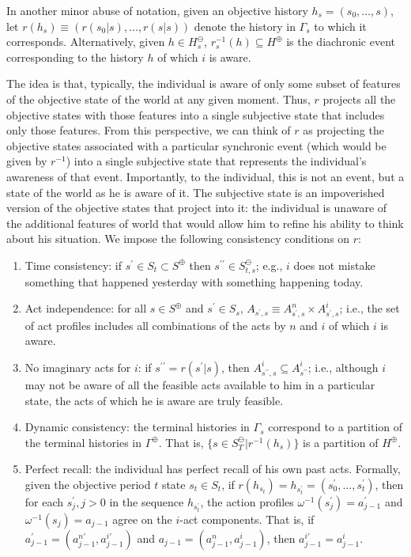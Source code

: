 \documentclass[
11pt,
titlepage,
reqno,
]{article}%
\theoremstyle{definition}
\begin{document}
In another minor abuse of notation, given an objective history $h_s=(s_0,\ldots,s)$, let $r(h_s)\equiv(r(s_0|s),\ldots,r(s|s))$ denote the history in $\Gamma_s$ to which it corresponds.
Alternatively, given $h\in H^\ominus_s$, $r^{-1}_s(h)\subseteq H^\oplus$ is the diachronic event corresponding to the history $h$ of which $i$ is aware.

The idea is that, typically, the individual is aware of only some subset of features of the objective state of the world at any given moment.
Thus, $r$ projects all the objective states with those features into a single subjective state that includes only those features.
From this perspective, we can think of $r$ as projecting the objective states associated with a particular synchronic event (which would be given by $r^{-1}$) into a single subjective state that represents the individual's awareness of that event.
Importantly, to the individual, this is not an event, but a state of the world as he is aware of it.
The subjective state is an impoverished version of the objective states that project into it: the individual is unaware of the additional features of world that would allow him to refine his ability to think about his situation. 
We impose the following consistency conditions on $r$:
\begin{enumerate}
	\item Time consistency: if $s^\prime\in S_t\subset S^\oplus$ then $s^{\prime\prime}\in S^\ominus_{t,s}$; e.g., $i$ does not mistake something that happened yesterday with something happening today.
	\item Act independence: for all $s\in S^\oplus$ and $s^\prime\in S_s$, $A_{s^\prime,s}\equiv A^n_{s^\prime,s}\times A^i_{s^\prime,s}$; i.e., the set of act profiles includes all combinations of the acts by $n$ and $i$ of which $i$ is aware.
	\item No imaginary acts for $i$: if $s^{\prime\prime}=r(s^\prime|s)$, then $A^i_{s^{\prime\prime},s}\subseteq A^i_{s^{\prime\prime}}$; i.e., although $i$ may not be aware of all the feasible acts available to him in a particular state, the acts of which he is aware are truly feasible.
	\item Dynamic consistency: the terminal histories in $\Gamma_s$ correspond to a partition of the terminal histories in $\Gamma^\oplus$. That is, $\{s\in S^\ominus_T|r^{-1}(h_s)\}$ is a partition of $H^\oplus$.
	\item Perfect recall: the individual has perfect recall of his own past acts. Formally, given the objective period $t$ state  $s_t\in S_t$, if $r(h_{s_t})=h_{s^\prime_t}=(s^\prime_0,\ldots,s^\prime_t)$, then for each $s^\prime_j,j>0$ in the sequence $h_{s^\prime_t}$, the action profiles $\omega^{-1}(s^\prime_j)=a^\prime_{j-1}$ and $\omega^{-1}(s_j)=a_{j-1}$ agree on the $i$-act components. That is, if $a^\prime_{j-1}=(a^{n\prime}_{j-1},a^{i\prime}_{j-1})$ and $a_{j-1}=(a^n_{j-1},a^i_{j-1})$, then $a^{i\prime}_{j-1}=a^i_{j-1}$.
\end{enumerate}
\end{document}
